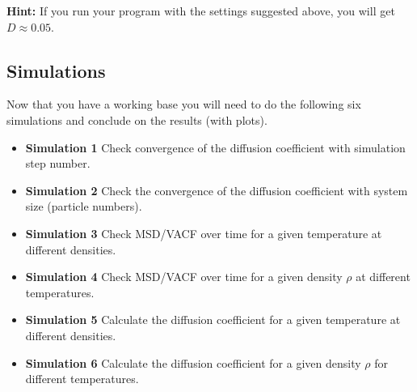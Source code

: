 \documentclass{article}
\begin{document}
\textbf{Hint:} If you run your program with the settings suggested above, you will get $D \approx 0.05$.

\subsection{Simulations}

Now that you have a working base you will need to do the following six simulations and conclude on the results (with plots).

\begin{itemize}
    \item {\bf Simulation 1}\newline
    Check convergence of the diffusion coefficient with simulation step number.

    \item {\bf Simulation 2}\newline
    Check the convergence of the diffusion coefficient with system size (particle numbers).

    \item {\bf Simulation 3}\newline
    Check MSD/VACF over time for a given temperature at different densities.

    \item {\bf Simulation 4}\newline
    Check MSD/VACF over time for a given density $\rho$ at different temperatures.

    \item {\bf Simulation 5}\newline
    Calculate the diffusion coefficient for a given temperature at different densities.

    \item {\bf Simulation 6}\newline
    Calculate the diffusion coefficient for a given density $\rho$ for different temperatures.

\end{itemize}

\end{document}
